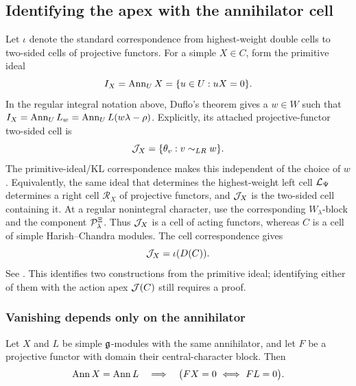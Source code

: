 \subsection{Identifying the apex with the annihilator cell}

Let $\iota$ denote the standard correspondence from highest-weight double
cells to two-sided cells of projective functors. For a simple $X\in C$,
form the primitive ideal
\[
  I_X=\operatorname{Ann}_U X=\{u\in U:uX=0\}.
\]
In the regular integral notation above, Duflo's theorem gives a $w\in W$
such that $I_X=\operatorname{Ann}_U L_w=\operatorname{Ann}_U L(w\lambda-\rho)$. Explicitly, its
attached projective-functor two-sided cell is
\begin{equation}\label{eq:strict-drop-annihilator-functor-cell}
  \mathcal{J}_X=\{\theta_v:v\sim_{LR}w\}.
\end{equation}
The primitive-ideal/KL correspondence makes this independent of the
choice of $w$. Equivalently, the same ideal that determines the
highest-weight left cell $\mathcal{L}_\Psi$ determines a right cell
$\mathcal R_X$ of projective functors, and $\mathcal{J}_X$ is the two-sided cell
containing it. At a regular nonintegral character, use the corresponding
$W_\lambda$-block and the component $\mathcal{P}_\lambda^\Xi$. Thus $\mathcal{J}_X$ is a
cell of acting functors, whereas $C$ is a cell of simple Harish--Chandra
modules. The cell correspondence gives
\begin{equation}\label{eq:strict-drop-annihilator-correspondence}
  \mathcal{J}_X=\iota(D(C)).
\end{equation}
See \cite[\S\S2.6, 3.2]{MackaayMazorchukMiemietz2024}. This identifies
two constructions from the primitive ideal; identifying either of them
with the action apex $\mathcal{J}(C)$ still requires a proof.

\subsubsection{Vanishing depends only on the annihilator}

\begin{lem}\label{lem:strict-drop-annihilator-vanishing}
Let $X$ and $L$ be simple $\mathfrak{g}$-modules with the same annihilator, and let
$F$ be a projective functor with domain their central-character block.
Then
\begin{equation}\label{eq:strict-drop-annihilator-vanishing}
  \operatorname{Ann} X=\operatorname{Ann} L\quad\Longrightarrow\quad
  \bigl(FX=0\ \Longleftrightarrow\ FL=0\bigr).
\end{equation}
\end{lem}


